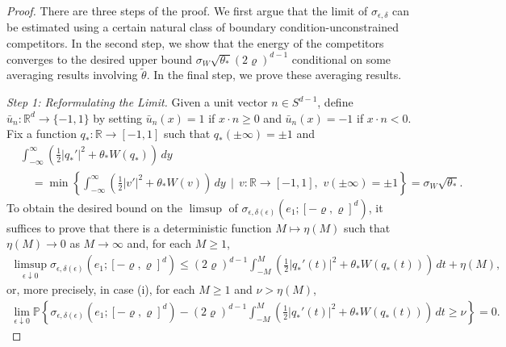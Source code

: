 \documentclass[10pt,a4paper]{amsart}
\begin{document}
	\begin{proof} There are three steps of the proof.  We first argue that the limit of $\sigma_{\epsilon,\delta}$ can be estimated using a certain natural class of boundary condition-unconstrained competitors.  In the second step, we show that the energy of the competitors converges to the desired upper bound $\sigma_{W} \sqrt{ \theta_{*} } ( 2 \varrho )^{d-1}$ conditional on some averaging results involving $\tilde{\theta}$.  In the final step, we prove these averaging results.

    \textit{Step 1: Reformulating the Limit.} Given a unit vector $n \in S^{d-1}$,  define $\bar{u}_{n} : \mathbb{R}^{d} \to \{-1,1\}$ by setting $\bar{u}_{n}(x) = 1$ if $x \cdot n \geq 0$ and $\bar{u}_{n}(x) = -1$ if $x \cdot n < 0$.  Fix a function $q_{*} : \mathbb{R} \to [-1,1]$ such that $q_{*}(\pm \infty) = \pm 1$ and
		\begin{align*}
			&\int_{-\infty}^{\infty} \left( \frac{1}{2} | q_{*}' |^{2} + \theta_{*} W ( q_{*} ) \right) \, dy \\
			&\quad= \min \left\{ \int_{-\infty}^{\infty} \left( \frac{1}{2} | v' |^{2} + \theta_{*} W ( v ) \right) \, dy \, \mid \, v : \mathbb{R} \to [-1,1], \, \, v(\pm \infty) = \pm1 \right\} = \sigma_{W} \sqrt{ \theta_{*} }.
		\end{align*}
    To obtain the desired bound on the $\limsup$ of $\sigma_{\epsilon,\delta(\epsilon)}(e_{1};[-\varrho,\varrho]^{d})$, it suffices to prove that there is a deterministic function $M \mapsto \eta(M)$ such that $\eta(M) \to 0$ as $M \to \infty$ and, for each $M \geq 1$, 
        \begin{align} \label{E: limsup bound generalities}
            \limsup_{ \epsilon \downarrow 0 } \sigma_{ \epsilon, \delta(\epsilon) } ( e_{1} ; [-\varrho,\varrho]^{d} ) \leq (2 \varrho)^{d-1} \int_{-M}^{M} \left( \frac{1}{2} |q_{*}'(t)|^{2} + \theta_{*} W(q_{*}(t)) \right) \, dt + \eta(M),
        \end{align}
    or, more precisely, in case (i), for each $M \geq 1$ and $\nu > \eta(M)$,        
        \begin{align*}
            \lim_{ \epsilon \downarrow 0 } \mathbb{P} \left\{ \sigma_{ \epsilon, \delta(\epsilon) } ( e_{1} ; [-\varrho,\varrho]^{d} ) - (2 \varrho)^{d-1} \int_{-M}^{M} \left( \frac{1}{2} |q_{*}'(t)|^{2} + \theta_{*} W(q_{*}(t)) \right) \, dt \geq \nu \right\} = 0.
        \end{align*}
        

\end{proof}
\end{document}

